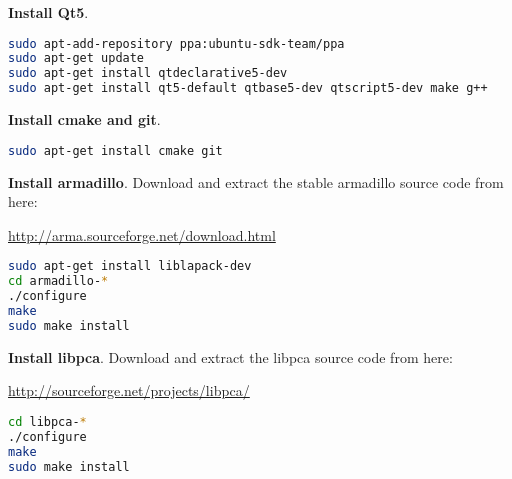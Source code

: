 \documentclass[hidelinks,10pt]{article}
\begin{document}
\noindent
\textbf{Install Qt5}.

{\color{color1}
\begin{lstlisting}[language=bash]
sudo apt-add-repository ppa:ubuntu-sdk-team/ppa
sudo apt-get update
sudo apt-get install qtdeclarative5-dev
sudo apt-get install qt5-default qtbase5-dev qtscript5-dev make g++
\end{lstlisting}}

\noindent
\textbf{Install cmake and git}.
{\color{color1}
\begin{lstlisting}[language=bash]
sudo apt-get install cmake git
\end{lstlisting}}

\noindent
\textbf{Install armadillo}. Download and extract the stable armadillo source code from here:

\href{http://arma.sourceforge.net/download.html}{http://arma.sourceforge.net/download.html}

{\color{color1}
\begin{lstlisting}[language=bash]
sudo apt-get install liblapack-dev
cd armadillo-*
./configure
make
sudo make install
\end{lstlisting}}

\noindent
\textbf{Install libpca}. Download and extract the libpca source code from here:

\href{http://sourceforge.net/projects/libpca/}{http://sourceforge.net/projects/libpca/}

{\color{color1}
\begin{lstlisting}[language=bash]
cd libpca-*
./configure
make
sudo make install
\end{lstlisting}}
\end{document}
